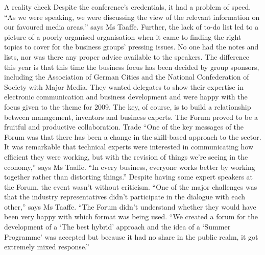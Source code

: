 \documentclass{article}%
\begin{document}
A reality check\newline%
Despite the conference’s credentials, it had a problem of speed. “As we were speaking, we were discussing the view of the relevant information on our favoured media areas,” says Ms Taaffe.\newline%
Further, the lack of to{-}do list led to a picture of a poorly organised organisation when it came to finding the right topics to cover for the business groups’ pressing issues.\newline%
No one had the notes and lists, nor was there any proper advice available to the speakers.\newline%
The difference this year is that this time the business focus has been decided by group sponsors, including the Association of German Cities and the National Confederation of Society with Major Media.\newline%
They wanted delegates to show their expertise in electronic communication and business development and were happy with the focus given to the theme for 2009.\newline%
The key, of course, is to build a relationship between management, inventors and business experts.\newline%
The Forum proved to be a fruitful and productive collaboration.\newline%
Trade\newline%
“One of the key messages of the Forum was that there has been a change in the skill{-}based approach to the sector. It was remarkable that technical experts were interested in communicating how efficient they were working, but with the revision of things we’re seeing in the economy,” says Ms Taaffe.\newline%
“In every business, everyone works better by working together rather than distorting things.”\newline%
Despite having some expert speakers at the Forum, the event wasn’t without criticism. “One of the major challenges was that the industry representatives didn’t participate in the dialogue with each other,” says Ms Taaffe.\newline%
“The Forum didn’t understand whether they would have been very happy with which format was being used.\newline%
“We created a forum for the development of a ‘The best hybrid’ approach and the idea of a ‘Summer Programme’ was accepted but because it had no share in the public realm, it got extremely mixed response.”\newline%
\end{document}
